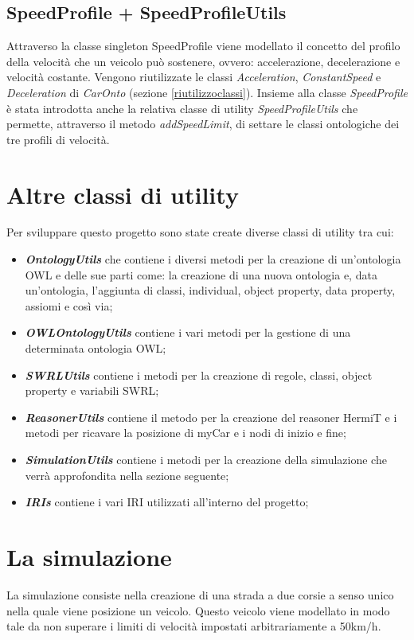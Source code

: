 \subsection{SpeedProfile + SpeedProfileUtils}
Attraverso la classe singleton SpeedProfile viene modellato il concetto del profilo della velocit\`a che un veicolo pu\`o sostenere, ovvero: accelerazione, decelerazione e velocit\`a costante.
Vengono riutilizzate le classi \textit{Acceleration}, \textit{ConstantSpeed} e \textit{Deceleration} di \textit{CarOnto} (sezione \ref{riutilizzoclassi}).
Insieme alla classe \textit{SpeedProfile} \`e stata introdotta anche la relativa classe di utility \textit{SpeedProfileUtils} che permette, attraverso il metodo \textit{addSpeedLimit}, di settare le classi ontologiche dei tre profili di velocit\`a.
\section{Altre classi di utility}
Per sviluppare questo progetto sono state create diverse classi di utility tra cui:
\begin{itemize}
\item \textit{\textbf{OntologyUtils}} che contiene i diversi metodi per la creazione di un'ontologia OWL e delle sue parti come: la creazione di una nuova ontologia e, data un'ontologia, l'aggiunta di classi, individual, object property, data property, assiomi e cos\`i via;
\item \textit{\textbf{OWLOntologyUtils}} contiene i vari metodi per la gestione di una determinata ontologia OWL;
\item \textit{\textbf{SWRLUtils}} contiene i metodi per la creazione di regole, classi, object property e variabili SWRL;
\item \textit{\textbf{ReasonerUtils}} contiene il metodo per la creazione del reasoner HermiT e i metodi per ricavare la posizione di myCar e i nodi di inizio e fine;
\item \textit{\textbf{SimulationUtils}} contiene i metodi per la creazione della simulazione che verr\`a approfondita nella sezione seguente;
\item \textit{\textbf{IRIs}} contiene i vari IRI utilizzati all'interno del progetto;
\end{itemize}

\section{La simulazione}
La simulazione consiste nella creazione di una strada a due corsie a senso unico nella quale viene posizione un veicolo.
Questo veicolo viene modellato in modo tale da non superare i limiti di velocit\`a impostati arbitrariamente a 50km/h.
